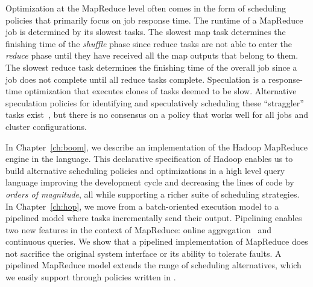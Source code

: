 Optimization at the MapReduce level often comes in the form of scheduling
policies that primarily focus on job response time.  The runtime of a MapReduce
job is determined by its slowest tasks.  The slowest map task determines the
finishing time of the {\em shuffle} phase since reduce tasks are not able to
enter the {\em reduce} phase until they have received all the map outputs that
belong to them.  The slowest reduce task determines the finishing time of the
overall job since a job does not complete until all reduce tasks complete.
Speculation is a response-time optimization that executes clones of tasks
deemed to be slow.  Alternative speculation policies for identifying and
speculatively scheduling these ``straggler'' tasks exist~\cite{mapreduce-osdi,
zaharia-late}, but there is no consensus on a policy that works well for all
jobs and cluster configurations.

In Chapter~\ref{ch:boom}, we describe an implementation of the Hadoop MapReduce
engine in the \OVERLOG language.  This declarative specification of Hadoop
enables us to build alternative scheduling policies and optimizations in a high
level query language improving the development cycle and decreasing the lines
of code by {\em orders of magnitude}, all while supporting a richer suite of
scheduling strategies.  In Chapter~\ref{ch:hop}, we move from a batch-oriented
execution model to a pipelined model where tasks incrementally send their
output.  Pipelining enables two new features in the context of MapReduce:
online aggregation~\cite{onlineagg} and continuous queries.  We show that a
pipelined implementation of MapReduce does not sacrifice the original system
interface or its ability to tolerate faults.  A pipelined MapReduce model
extends the range of scheduling alternatives, which we easily support through
policies written in \OVERLOG.

